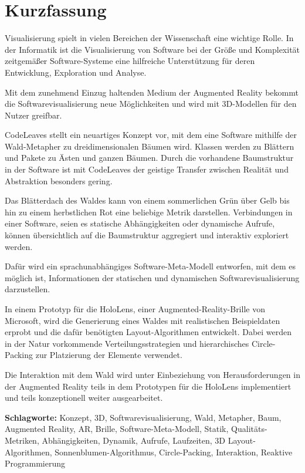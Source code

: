 \chapter*{Kurzfassung}
\thispagestyle{empty}

Visualisierung spielt in vielen Bereichen der Wissenschaft eine wichtige Rolle. In der Informatik ist die Visualisierung von Software bei der Größe und Komplexität zeitgemäßer Software-Systeme eine hilfreiche Unterstützung für deren Entwicklung, Exploration und Analyse.

Mit dem zunehmend Einzug haltenden Medium der Augmented Reality bekommt die Softwarevisualisierung neue Möglichkeiten und wird mit 3D-Modellen für den Nutzer greifbar.

CodeLeaves stellt ein neuartiges Konzept vor, mit dem eine Software mithilfe der Wald-Metapher zu dreidimensionalen Bäumen wird. Klassen werden zu Blättern und Pakete zu Ästen und ganzen Bäumen. Durch die vorhandene Baumstruktur in der Software ist mit CodeLeaves der geistige Transfer zwischen Realität und Abstraktion besonders gering.

Das Blätterdach des Waldes kann von einem sommerlichen Grün über Gelb bis hin zu einem herbstlichen Rot eine beliebige Metrik darstellen. Verbindungen in einer Software, seien es statische Abhängigkeiten oder dynamische Aufrufe, können übersichtlich auf die Baumstruktur aggregiert und interaktiv exploriert werden.

Dafür wird ein sprachunabhängiges Software-Meta-Modell entworfen, mit dem es möglich ist, Informationen der statischen und dynamischen Softwarevisualisierung darzustellen.

In einem Prototyp für die HoloLens, einer Augmented-Reality-Brille von Microsoft, wird die Generierung eines Waldes mit realistischen Beispieldaten erprobt und die dafür benötigten Layout-Algorithmen entwickelt. Dabei werden in der Natur vorkommende Verteilungsstrategien und hierarchisches Circle-Packing zur Platzierung der Elemente verwendet.

Die Interaktion mit dem Wald wird unter Einbeziehung von Herausforderungen in der Augmented Reality teils in dem Prototypen für die HoloLens implementiert und teils konzeptionell weiter ausgearbeitet.

\bigskip
\noindent \textbf{Schlagworte:} Konzept, 3D, Softwarevisualisierung, Wald, Metapher, Baum, Augmented Reality, AR, Brille, Software-Meta-Modell, Statik, Qualitäts-Metriken, Abhängigkeiten, Dynamik, Aufrufe, Laufzeiten, 3D Layout-Algorithmen, Sonnenblumen-Algorithmus, Circle-Packing, Interaktion, Reaktive Programmierung
